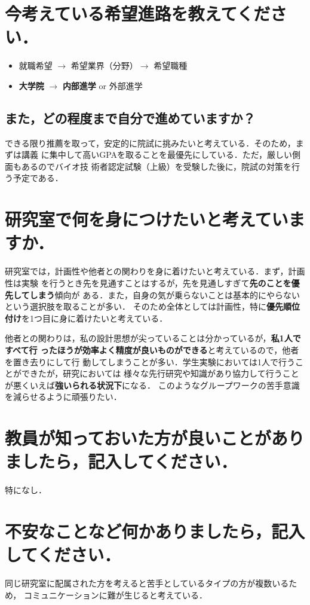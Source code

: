 \documentclass[a4paper,11pt]{ltjsarticle}
\begin{document}
\pagestyle{fancy}
\lfoot{}
\cfoot{\thepage}

\section{今考えている希望進路を教えてください．}

\begin{itemize}
    \item 就職希望 $\rightarrow$ 希望業界（分野）$\rightarrow$ 希望職種
    \item \textbf{大学院} $\rightarrow$ \textbf{内部進学} or 外部進学
\end{itemize}

\subsection{また，どの程度まで自分で進めていますか？}

できる限り推薦を取って，安定的に院試に挑みたいと考えている．そのため，まずは講義
に集中して高いGPAを取ることを最優先にしている．ただ，厳しい側面もあるのでバイオ技
術者認定試験（上級）を受験した後に，院試の対策を行う予定である．

\section{研究室で何を身につけたいと考えていますか．}

研究室では，計画性や他者との関わりを身に着けたいと考えている．まず，計画性は実験
を行うとき先を見通すことはするが，先を見通しすぎて\textbf{先のことを優先してしまう}傾向が
ある．また，自身の気が乗らないことは基本的にやらないという選択肢を取ることが多い．
そのため全体としては計画性，特に\textbf{優先順位付け}を1つ目に身に着けたいと考えている．

他者との関わりは，私の設計思想が尖っていることは分かっているが，\textbf{私1人ですべて行
ったほうが効率よく精度が良いものができる}と考えているので，他者を置き去りにして行
動してしまうことが多い．学生実験においては1人で行うことができたが，研究においては
様々な先行研究や知識があり協力して行うことが悪くいえば\textbf{強いられる状況下}になる．
このようなグループワークの苦手意識を減らせるように頑張りたい．


\section{教員が知っておいた方が良いことがありましたら，記入してください．}

特になし．

\section{不安なことなど何かありましたら，記入してください．}

同じ研究室に配属された方を考えると苦手としているタイプの方が複数いるため，
コミュニケーションに難が生じると考えている．
\end{document}
